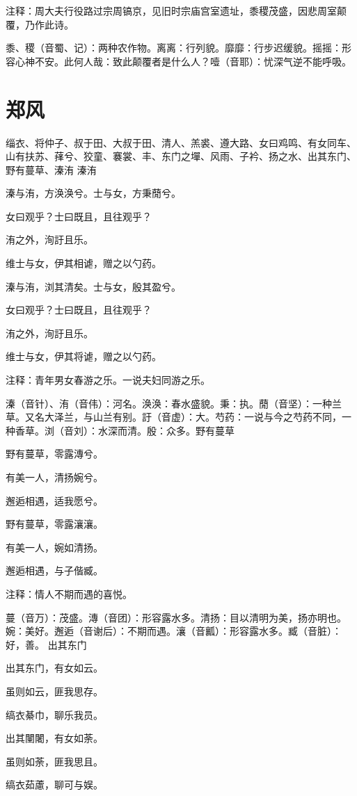\documentclass[12pt,UTF8]{ctexbook}
\begin{document}
注释：周大夫行役路过宗周镐京，见旧时宗庙宫室遗址，黍稷茂盛，因悲周室颠覆，乃作此诗。 

黍、稷（音蜀、记）：两种农作物。离离：行列貌。靡靡：行步迟缓貌。摇摇：形容心神不安。此何人哉：致此颠覆者是什么人？噎（音耶）：忧深气逆不能呼吸。



\part{郑风}
缁衣、将仲子、叔于田、大叔于田、清人、羔裘、遵大路、女曰鸡鸣、有女同车、山有扶苏、萚兮、狡童、褰裳、丰、东门之墠、风雨、子衿、扬之水、出其东门、野有蔓草、溱洧
溱洧

溱与洧，方涣涣兮。士与女，方秉蕑兮。

女曰观乎？士曰既且，且往观乎？

洧之外，洵訏且乐。

维士与女，伊其相谑，赠之以勺药。

溱与洧，浏其清矣。士与女，殷其盈兮。

女曰观乎？士曰既且，且往观乎？

洧之外，洵訏且乐。

维士与女，伊其将谑，赠之以勺药。

注释：青年男女春游之乐。一说夫妇同游之乐。

溱（音针）、洧（音伟）：河名。涣涣：春水盛貌。秉：执。蕑（音坚）：一种兰草。又名大泽兰，与山兰有别。訏（音虚）：大。芍药：一说与今之芍药不同，一种香草。浏（音刘）：水深而清。殷：众多。野有蔓草

野有蔓草，零露漙兮。

有美一人，清扬婉兮。

邂逅相遇，适我愿兮。

野有蔓草，零露瀼瀼。

有美一人，婉如清扬。

邂逅相遇，与子偕臧。

注释：情人不期而遇的喜悦。

蔓（音万）：茂盛。漙（音团）：形容露水多。清扬：目以清明为美，扬亦明也。婉：美好。邂逅（音谢后）：不期而遇。瀼（音瓤）：形容露水多。臧（音脏）：好，善。 出其东门

出其东门，有女如云。

虽则如云，匪我思存。

缟衣綦巾，聊乐我员。

出其闉闍，有女如荼。

虽则如荼，匪我思且。

缟衣茹藘，聊可与娱。
\end{document}
